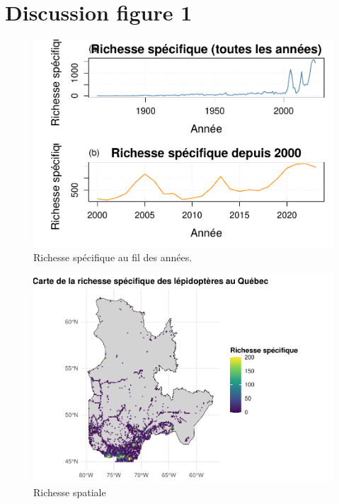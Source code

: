\documentclass[9pt,twocolumn,twoside,]{pnas-new}
\begin{document}
\section*{Discussion figure 1}\label{discussion-figure-1}

\begin{figure}

{\centering \includegraphics[width=0.7\linewidth]{rapport_final_BIO500_files/figure-latex/fig_richesse_temporelle-1} 

}

\caption{\label{fig:fig_richesse_temporelle}Richesse spécifique au fil des années.}\label{fig:fig_richesse_temporelle}
\end{figure}

\begin{figure}

{\centering \includegraphics[width=0.7\linewidth]{rapport_final_BIO500_files/figure-latex/fig_richesse_spatiale-1} 

}

\caption{\label{fig:fig_richesse_spatiale}Richesse spatiale }\label{fig:fig_richesse_spatiale}
\end{figure}
\end{document}
